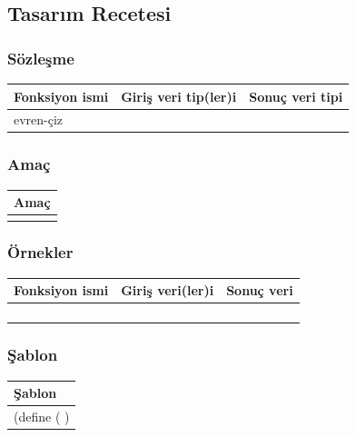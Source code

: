\documentclass[12pt, a4paper]{article}
\newcommand\fillin[1][3cm]{\makebox[#1]{\dotfill}}
\begin{document}
\newpage
\subsection*{Tasarım Recetesi}
\subsubsection*{Sözleşme}
\begin{tabular}{| p{4cm} | p{8cm} | p{4cm} |  }
\hline			
Fonksiyon ismi&Giriş veri tip(ler)i&Sonuç veri tipi\\
\hline
evren-çiz& & \\[10ex]
\hline  
\end{tabular}

\subsubsection*{Amaç}
\begin{tabular}{| p{17cm} |  }
\hline			
Amaç\\
\hline
 \\[10ex]
\hline  
\end{tabular}

\subsubsection*{Örnekler}
\begin{tabular}{| p{4cm} | p{8cm} | p{4cm} |  }
\hline			
Fonksiyon ismi&Giriş veri(ler)i&Sonuç veri\\
\hline
& & \\[6ex]
\hline  
& & \\[6ex]
\hline  
& & \\[6ex]
\hline  
& & \\[6ex]
\hline  
\end{tabular}

\subsubsection*{Şablon}
\begin{tabular}{| p{17cm} |  }
\hline			
Şablon\\
\hline
\vspace{0,2cm}
(define (\fillin[2cm] \hspace{1cm}  \fillin[8cm] ) \\[30ex]
\hline  
\end{tabular}
\end{document}
